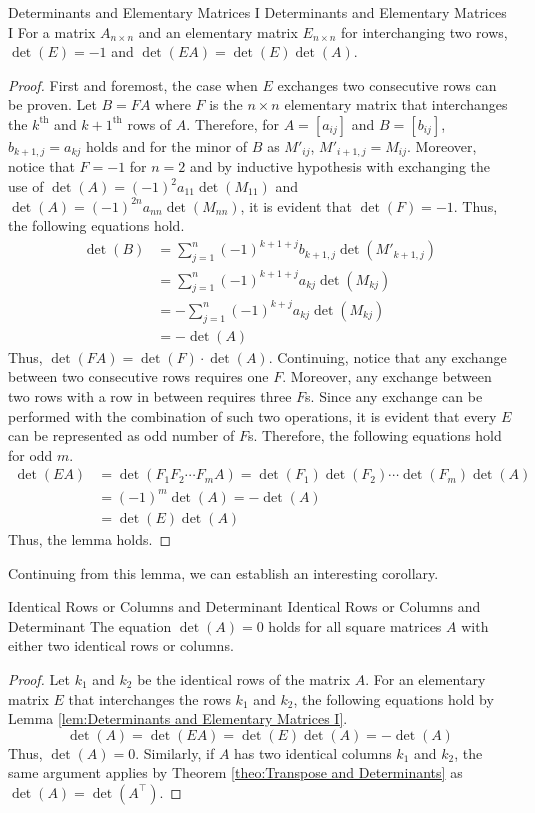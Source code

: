 \documentclass[../main.tex]{subfiles}
\begin{document}
\begin{lemma}{Determinants and Elementary Matrices I}
{Determinants and Elementary Matrices I}
For a matrix $A_{n \times n}$ and an elementary matrix
$E_{n \times n}$ for interchanging two rows, $\det(E) = -1$
and $\det(EA) = \det(E) \det(A)$.
\end{lemma}
\begin{proof}
First and foremost, the case when $E$ exchanges two consecutive
rows can be proven. Let $B = FA$ where $F$ is the $n \times n$
elementary matrix that interchanges the $k^\text{th}$ and
$k+1^\text{th}$ rows of $A$. Therefore, for $A = [a_{ij}]$ and
$B = [b_{ij}]$, $b_{k+1,j} = a_{kj}$ holds and for the minor of $B$ as
$M'_{ij}$, $M'_{i+1,j} = M_{ij}$. Moreover, notice that $F = -1$ for
$n = 2$ and by inductive hypothesis with exchanging the use of
$\det(A) = (-1)^2 a_{11} \det(M_{11})$ and $\det(A) = (-1)^{2n} a_{nn}
\det(M_{nn})$, it is evident that $\det(F) = -1$. Thus, the following
equations hold.
\begin{align*}
    \det(B)
    &= \sum_{j=1}^n (-1)^{k+1+j} b_{k+1,j} \det(M'_{k+1,j}) \\
    &= \sum_{j=1}^n (-1)^{k+1+j} a_{kj} \det(M_{kj}) \\
    &= -\sum_{j=1}^n (-1)^{k+j} a_{kj} \det(M_{kj}) \\
    &= -\det(A)
\end{align*}
Thus, $\det(FA) = \det(F) \cdot \det(A)$. Continuing, notice that
any exchange between two consecutive rows requires one $F$. Moreover,
any exchange between two rows with a row in between requires three
$F$s. Since any exchange can be performed with the combination of
such two operations, it is evident that every $E$ can be represented
as odd number of $F$s. Therefore, the following equations hold for
odd $m$.
\begin{align*}
    \det(EA)
    &= \det(F_1 F_2 \cdots F_m A)
    = \det(F_1) \det(F_2) \cdots \det(F_m) \det(A) \\
    &= (-1)^m \det(A)
    = -\det(A) \\
    &= \det(E) \det(A)
\end{align*}
Thus, the lemma holds.
\end{proof}

Continuing from this lemma, we can establish an interesting corollary.

\begin{corollary}{Identical Rows or Columns and Determinant}
{Identical Rows or Columns and Determinant}
The equation $\det(A) = 0$ holds for all square matrices $A$ with
either two identical rows or columns.
\end{corollary}
\begin{proof}
Let $k_1$ and $k_2$ be the identical rows of the matrix $A$.
For an elementary matrix $E$ that interchanges the rows $k_1$ and
$k_2$, the following equations hold by Lemma \ref{lem:Determinants
and Elementary Matrices I}.
\[
\det(A)
= \det(EA)
= \det(E) \det(A)
= -\det(A)
\]
Thus, $\det(A) = 0$. Similarly, if $A$ has two identical columns
$k_1$ and $k_2$, the same argument applies by Theorem
\ref{theo:Transpose and Determinants} as $\det(A) =
\det(A^\intercal)$.
\end{proof}
\end{document}
